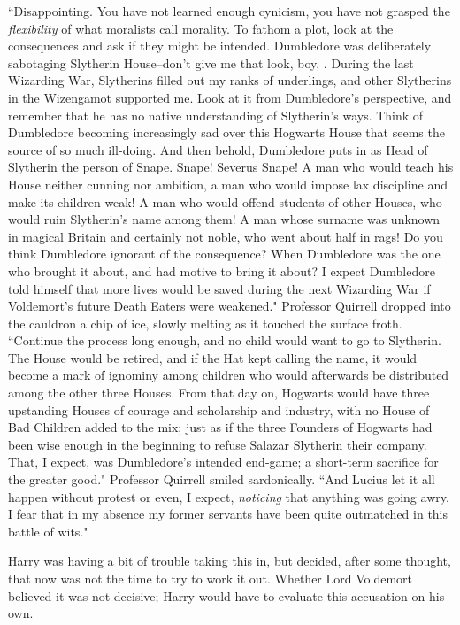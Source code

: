 ``Disappointing. You have not learned enough cynicism, you have not grasped the \emph{flexibility} of what moralists call morality. To fathom a plot, look at the consequences and ask if they might be intended. Dumbledore was deliberately sabotaging Slytherin House\---don't give me that look, boy, . During the last Wizarding War, Slytherins filled out my ranks of underlings, and other Slytherins in the Wizengamot supported me. Look at it from Dumbledore's perspective, and remember that he has no native understanding of Slytherin's ways. Think of Dumbledore becoming increasingly sad over this Hogwarts House that seems the source of so much ill-doing. And then behold, Dumbledore puts in as Head of Slytherin the person of Snape. Snape! Severus Snape! A man who would teach his House neither cunning nor ambition, a man who would impose lax discipline and make its children weak! A man who would offend students of other Houses, who would ruin Slytherin's name among them! A man whose surname was unknown in magical Britain and certainly not noble, who went about half in rags! Do you think Dumbledore ignorant of the consequence? When Dumbledore was the one who brought it about, and had motive to bring it about? I expect Dumbledore told himself that more lives would be saved during the next Wizarding War if Voldemort's future Death Eaters were weakened." Professor Quirrell dropped into the cauldron a chip of ice, slowly melting as it touched the surface froth. ``Continue the process long enough, and no child would want to go to Slytherin. The House would be retired, and if the Hat kept calling the name, it would become a mark of ignominy among children who would afterwards be distributed among the other three Houses. From that day on, Hogwarts would have three upstanding Houses of courage and scholarship and industry, with no House of Bad Children added to the mix; just as if the three Founders of Hogwarts had been wise enough in the beginning to refuse Salazar Slytherin their company. That, I expect, was Dumbledore's intended end-game; a short-term sacrifice for the greater good." Professor Quirrell smiled sardonically. ``And Lucius let it all happen without protest or even, I expect, \emph{noticing} that anything was going awry. I fear that in my absence my former servants have been quite outmatched in this battle of wits."

Harry was having a bit of trouble taking this in, but decided, after some thought, that now was not the time to try to work it out. Whether Lord Voldemort believed it was not decisive; Harry would have to evaluate this accusation on his own.

